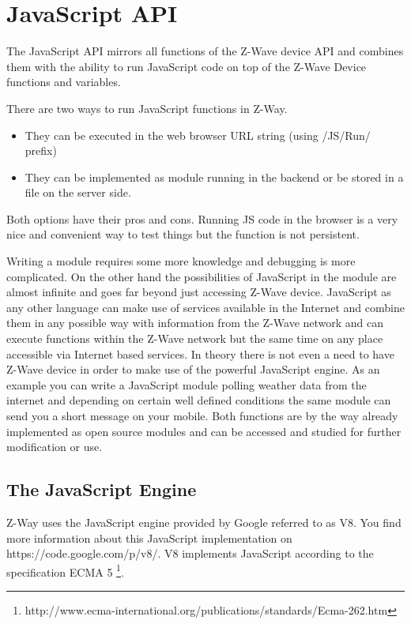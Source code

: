\chapter{JavaScript API}
\label{jsapi}

The JavaScript API mirrors all functions of the Z-Wave device API and 
combines them with the ability to run JavaScript code on top of the 
Z-Wave Device functions and variables.

There are two ways to run JavaScript functions in Z-Way.
\begin{itemize}
\item They can be executed in the web browser URL string (using /JS/Run/ prefix)
\item They can be implemented as module running in the backend or be stored in a file on the server side.
\end{itemize}
Both options have their pros and cons. Running JS code in the browser is a very nice
and convenient way to test things but the function is not persistent.

Writing a module requires some more knowledge and debugging is more complicated. 
On the other hand the possibilities of JavaScript in the module are almost infinite 
and goes far beyond just accessing Z-Wave device. JavaScript as any other language
can make use of services available in the Internet and combine them in any possible 
way with information from the Z-Wave network and can execute functions within 
the Z-Wave network but the same time on any place accessible via Internet based 
services. In theory there is not even a need to have Z-Wave device in order to make 
use of the powerful JavaScript engine. As an example you can write a JavaScript 
module polling weather data from the internet and depending on certain well defined 
conditions the same module can send you a short message on your mobile.
Both functions are by the way already implemented as open source modules and can be 
accessed and studied for further modification or use.

\section {The JavaScript Engine}

Z-Way uses the JavaScript engine provided by Google referred to as V8. You find more 
information about this JavaScript implementation on https://code.google.com/p/v8/.
V8 implements JavaScript according to the specification ECMA 5
\footnote {http://www.ecma-international.org/publications/standards/Ecma-262.htm}.

